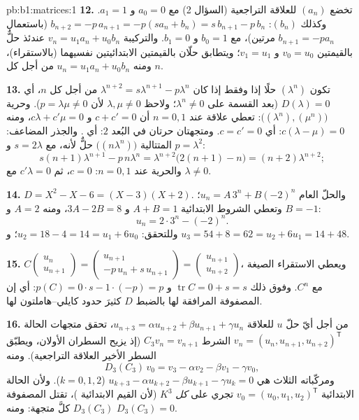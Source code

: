 \begin{solution}{pb:b1:matrices:1}
\textbf{12.} تخضع $(a_n)$ للعلاقة التراجعية (السؤال 2) مع $a_0
= 0$ و $a_1 = 1$. وكذلك $(b_n)$: $b_{n+2} = -p\,a_{n+1} =
-p(s a_n + b_n) = s\,b_{n+1} - p\,b_n$ (باستعمال $b_{n+1} = -pa_n$
مرتين)، مع $b_0 = 1$ و $b_1 = 0$. والتركيبة $v_n =
u_1 a_n + u_0 b_n$ عندئذ حلٌّ بالقيمتين $v_0 = u_0$ و $v_1 =
u_1$؛ ويتطابق حلّان بالقيمتين الابتدائيتين نفسيهما
(بالاستقراء)، ومنه $u_n = u_1 a_n + u_0 b_n$ من أجل كل $n$.

\textbf{13.} تكون $(\lambda^n)$ حلًا إذا وفقط إذا كان $\lambda^{n+2} =
s\lambda^{n+1} - p\lambda^n$ من أجل كل $n$، أي $D(\lambda) = 0$
(بعد القسمة على $\lambda^n \neq 0$؛ ولاحظ $\lambda, \mu \neq
0$ لأن $p = \lambda\mu \neq 0$). وحرية
$\bigl((\lambda^n), (\mu^n)\bigr)$: تعطي علاقة عند $n = 0, 1$
أن $c + c' = 0$ و $c\lambda + c'\mu = 0$، ومنه $c(\lambda - \mu)
= 0$: أي $c = c' = 0$. ومتجهتان حرتان في البُعد $2$: أي .
والجذر المضاعف: المتتالية $\bigl((n\lambda^n)\bigr)$ حلٌّ لأنه،
مع $s = 2\lambda$ و $p = \lambda^2$:
\[
s(n+1)\lambda^{n+1} - p\,n\lambda^n
= \lambda^{n+2}\bigl(2(n+1) - n\bigr) = (n+2)\lambda^{n+2} ;
\]
والحرية عند $n = 0, 1$: $c = 0$، ثم $c'\lambda = 0$ مع
$\lambda \neq 0$.

\textbf{14.} $D = X^2 - X - 6 = (X - 3)(X + 2)$. والحلّ
العام $u_n = A\,3^n + B(-2)^n$؛ وتعطي الشروط الابتدائية
$A + B = 1$ و $3A - 2B = 8$، ومنه $A = 2$ و $B = -1$:
\[
u_n = 2\cdot 3^n - (-2)^n .
\]
وللتحقق: $u_2 = 18 - 4 = 14 = u_1 + 6u_0$؛ و $u_3 = 54 + 8 = 62 =
u_2 + 6u_1 = 14 + 48$.

\textbf{15.} $C\begin{pmatrix} u_n\\ u_{n+1}\end{pmatrix} =
\begin{pmatrix} u_{n+1}\\ -p\,u_n + s\,u_{n+1}\end{pmatrix} =
\begin{pmatrix} u_{n+1}\\ u_{n+2}\end{pmatrix}$، ويعطي الاستقراء
الصيغة مع $C^n$. وفوق ذلك $\operatorname{tr} C = 0
+ s = s$ و $p(C) = 0\cdot s - 1\cdot(-p) = p$: أي إن المصفوفة
المرافقة لها بالضبط $D$ كثيرَ حدود كايلي--هاملتون لها.

\textbf{16.} من أجل أيّ حلّ $u$ للعلاقة $u_{n+3} = \alpha u_{n+2} +
\beta u_{n+1} + \gamma u_n$، تحقق متجهات الحالة $v_n = (u_n,
u_{n+1}, u_{n+2})^{\mathsf T}$ الشرط $C_3 v_n = v_{n+1}$
(إذ يزيح السطران الأولان، ويطبّق السطر الأخير
العلاقة التراجعية). ومنه
\[
D_3(C_3)\,v_0 = v_3 - \alpha v_2 - \beta v_1 - \gamma v_0 ,
\]
ومركّباته الثلاث هي $u_{k+3} - \alpha u_{k+2} - \beta
u_{k+1} - \gamma u_k = 0$ ($k = 0, 1, 2$). ولأن الحالة الابتدائية
$v_0 = (u_0, u_1, u_2)^{\mathsf T}$ تجري على \emph{كل} $K^3$
(لأن القيم الابتدائية )، تقتل المصفوفة $D_3(C_3)$
كلَّ متجهة: ومنه $D_3(C_3) = 0$.


\end{solution}
